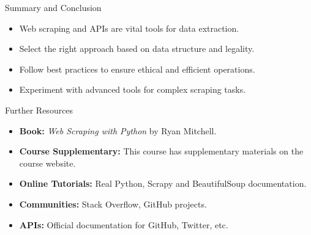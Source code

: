 \documentclass[10pt]{beamer}
\begin{document}
\begin{frame}[fragile]{Summary and Conclusion}
    \begin{itemize}
        \item Web scraping and APIs are vital tools for data extraction.
        \item Select the right approach based on data structure and legality.
        \item Follow best practices to ensure ethical and efficient operations.
        \item Experiment with advanced tools for complex scraping tasks.
    \end{itemize}
\end{frame}

\begin{frame}[fragile]{Further Resources}
    \begin{itemize}
        \item \textbf{Book:} \emph{Web Scraping with Python} by Ryan Mitchell.
        \item \textbf{Course Supplementary:} This course has supplementary materials on the course website.
        \item \textbf{Online Tutorials:} Real Python, Scrapy and BeautifulSoup documentation.
        \item \textbf{Communities:} Stack Overflow, GitHub projects.
        \item \textbf{APIs:} Official documentation for GitHub, Twitter, etc.
    \end{itemize}
\end{frame}
\end{document}
